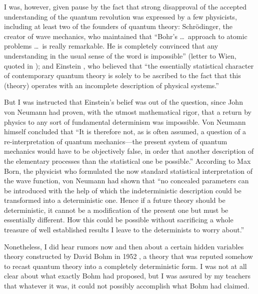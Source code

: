 I was, however, given pause by the fact that strong disapproval of the
accepted understanding of the quantum revolution was expressed by a few
physicists, including at least two of the founders of quantum theory:
Schr\"odinger, the creator of wave mechanics, who maintained that ``Bohr's
\dots\  approach to atomic problems \dots\   is really remarkable. He is
completely
convinced that any understanding in the usual sense of the word is
impossible'' (letter to Wien, quoted in \cite{Moore}); and Einstein
\cite{Einstein}, who believed that ``the essentially statistical character
of contemporary quantum theory is solely to be ascribed to the fact that
this (theory) operates with an incomplete description of physical
systems.''

But I was instructed that Einstein's belief was out of the question,
since John von Neumann had proven, with the utmost mathematical rigor, that
a return by physics to any sort of fundamental determinism was impossible.
Von Neumann himself \cite{vN} concluded that ``It is therefore not, as is
often assumed, a question of a re-interpretation of quantum mechanics---the
present system of quantum mechanics would have to be objectively false, in
order that another description of the elementary processes than the
statistical one be possible.'' According to Max Born, the physicist who
formulated the now standard statistical interpretation of the wave
function, von Neumann had shown that \cite{born} ``no concealed parameters
can be introduced with the help of which the indeterministic description
could be transformed into a deterministic one.  Hence if a future theory
should be deterministic, it cannot be a modification of the present one but
must be essentially different. How this could be possible without
sacrificing a whole treasure of well established results I leave to the
determinists to worry about.''

Nonetheless, I did hear rumors now and then about a certain
hidden variables theory constructed by David Bohm in 1952 \cite{Bohm52}, a
theory that was reputed somehow to recast quantum theory into a completely
deterministic form. I was not at all clear about what exactly Bohm had
proposed, but I was assured by my teachers that whatever it was, it could
not possibly accomplish what Bohm had claimed.

